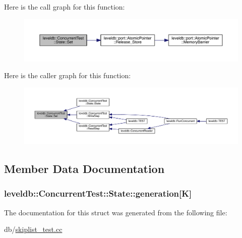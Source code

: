 Here is the call graph for this function\+:\nopagebreak
\begin{figure}[H]
\begin{center}
\leavevmode
\includegraphics[width=350pt]{structleveldb_1_1_concurrent_test_1_1_state_a7f44f6357aab5ecc3b9b629da8ae71e1_cgraph}
\end{center}
\end{figure}




Here is the caller graph for this function\+:\nopagebreak
\begin{figure}[H]
\begin{center}
\leavevmode
\includegraphics[width=350pt]{structleveldb_1_1_concurrent_test_1_1_state_a7f44f6357aab5ecc3b9b629da8ae71e1_icgraph}
\end{center}
\end{figure}




\subsection{Member Data Documentation}
\hypertarget{structleveldb_1_1_concurrent_test_1_1_state_aa9ffe50e1ae5b818b89aa8de547c9ddd}{}
\subsubsection[{generation}]{ leveldb\+::\+Concurrent\+Test\+::\+State\+::generation\mbox{[}{\bf K}\mbox{]}}\label{structleveldb_1_1_concurrent_test_1_1_state_aa9ffe50e1ae5b818b89aa8de547c9ddd}


The documentation for this struct was generated from the following file\+:\begin{DoxyCompactItemize}
\item 
db/\hyperlink{skiplist__test_8cc}{skiplist\+\_\+test.\+cc}\end{DoxyCompactItemize}

